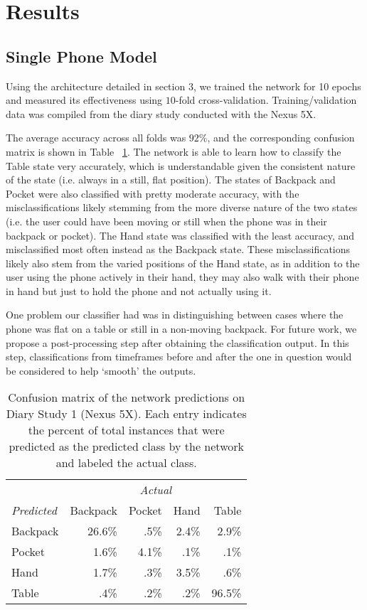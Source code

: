 \section{Results}
\subsection{Single Phone Model}
Using the architecture detailed in section 3, we trained the network for 10 epochs
and measured its effectiveness using $10$-fold cross-validation.
Training/validation data was compiled from the diary study conducted with the Nexus 5X.

The average accuracy across all folds was $92\%$, and the corresponding
confusion matrix is shown in Table ~\ref{fig:confusion1}.
 The network is able to learn how to  classify the Table state very accurately, which is understandable given  the consistent nature of the state (i.e. always in a still, flat position). 
The states of Backpack and Pocket were also classified with pretty moderate accuracy,
with the misclassifications likely stemming from the more diverse nature of 
the two states (i.e. the user could have been moving or still when the phone was
in their backpack or pocket). 
The Hand state was classified with the least accuracy,
and misclassified most often instead as the Backpack state. 
These misclassifications likely also stem from the varied positions of the Hand state, 
 as in addition to the user using the phone actively in their hand, 
 they may also walk with their phone in hand
 but just to hold the phone and not actually using it.
 
One problem our classifier had was in distinguishing between cases where the phone was flat on a table or still in a non-moving backpack.
For future work, we propose a post-processing step after obtaining the classification output.
In this step, classifications from timeframes before and after the one in question would be considered to help `smooth' the outputs.

\begin{table}[h]
\caption{Confusion matrix of the network predictions on Diary Study 1 (Nexus 5X). Each entry indicates the percent of
total instances that were predicted as the predicted class by the network and labeled the actual class.}\label{fig:confusion1} \centering
\begin{tabular}{ l rrrr }  
\toprule
      &  \multicolumn{4}{c}{\textit{Actual}} \\
\cmidrule{2-5}
\textit{Predicted}		&	Backpack    & 	Pocket 	& 	Hand	&	Table \\
\midrule
Backpack			&	26.6\% 	&	 .5\%		&	2.4\% 	&	2.9\% \\
Pocket			&	1.6\% 	&	4.1\% 	&	 .1\% 	&	 .1\% \\
Hand			&	1.7\% 	&	 .3\% 	&	3.5\% 	&	 .6\% \\
Table			&	 .4\% 	&	 .2\% 	&	 .2\% 	&	96.5\%\\
\bottomrule
\end{tabular}
\end{table}


